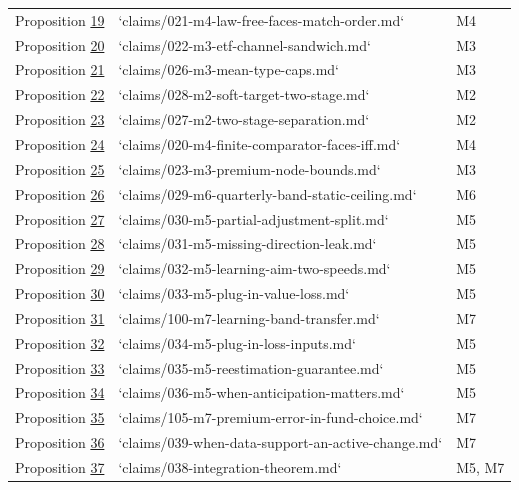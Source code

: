 \documentclass[11pt]{article}
\begin{document}
{\begin{longtable}{lll}
Proposition \hyperref[res:Proposition-19]{19} & `claims/021-m4-law-free-faces-match-order.md` & M4 \\
Proposition \hyperref[res:Proposition-20]{20} & `claims/022-m3-etf-channel-sandwich.md` & M3 \\
Proposition \hyperref[res:Proposition-21]{21} & `claims/026-m3-mean-type-caps.md` & M3 \\
Proposition \hyperref[res:Proposition-22]{22} & `claims/028-m2-soft-target-two-stage.md` & M2 \\
Proposition \hyperref[res:Proposition-23]{23} & `claims/027-m2-two-stage-separation.md` & M2 \\
Proposition \hyperref[res:Proposition-24]{24} & `claims/020-m4-finite-comparator-faces-iff.md` & M4 \\
Proposition \hyperref[res:Proposition-25]{25} & `claims/023-m3-premium-node-bounds.md` & M3 \\
Proposition \hyperref[res:Proposition-26]{26} & `claims/029-m6-quarterly-band-static-ceiling.md` & M6 \\
Proposition \hyperref[res:Proposition-27]{27} & `claims/030-m5-partial-adjustment-split.md` & M5 \\
Proposition \hyperref[res:Proposition-28]{28} & `claims/031-m5-missing-direction-leak.md` & M5 \\
Proposition \hyperref[res:Proposition-29]{29} & `claims/032-m5-learning-aim-two-speeds.md` & M5 \\
Proposition \hyperref[res:Proposition-30]{30} & `claims/033-m5-plug-in-value-loss.md` & M5 \\
Proposition \hyperref[res:Proposition-31]{31} & `claims/100-m7-learning-band-transfer.md` & M7 \\
Proposition \hyperref[res:Proposition-32]{32} & `claims/034-m5-plug-in-loss-inputs.md` & M5 \\
Proposition \hyperref[res:Proposition-33]{33} & `claims/035-m5-reestimation-guarantee.md` & M5 \\
Proposition \hyperref[res:Proposition-34]{34} & `claims/036-m5-when-anticipation-matters.md` & M5 \\
Proposition \hyperref[res:Proposition-35]{35} & `claims/105-m7-premium-error-in-fund-choice.md` & M7 \\
Proposition \hyperref[res:Proposition-36]{36} & `claims/039-when-data-support-an-active-change.md` & M7 \\
Proposition \hyperref[res:Proposition-37]{37} & `claims/038-integration-theorem.md` & M5, M7 \\

\end{longtable}}
\end{document}
